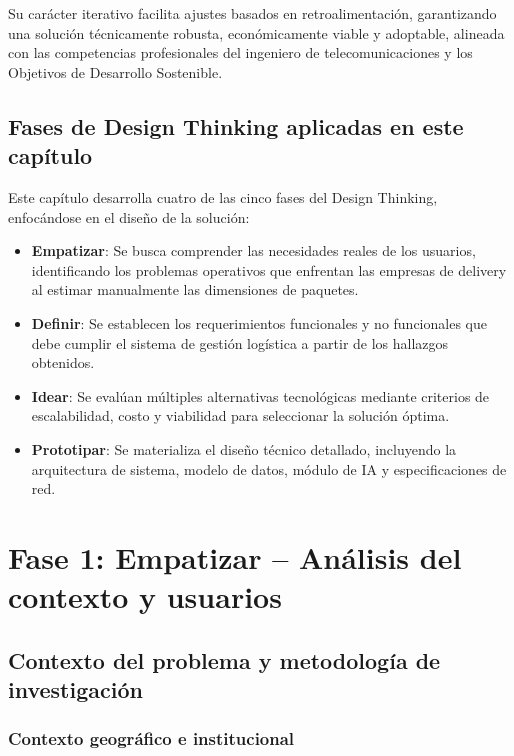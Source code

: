 Su carácter iterativo facilita ajustes basados en retroalimentación, garantizando una solución técnicamente robusta, económicamente viable y adoptable, alineada con las competencias profesionales del ingeniero de telecomunicaciones y los Objetivos de Desarrollo Sostenible.

\subsection{Fases de Design Thinking aplicadas en este capítulo}

Este capítulo desarrolla cuatro de las cinco fases del Design Thinking, enfocándose en el diseño de la solución:

\begin{itemize}
    \item \textbf{Empatizar}: Se busca comprender las necesidades reales de los usuarios, identificando los problemas operativos que enfrentan las empresas de delivery al estimar manualmente las dimensiones de paquetes.
    
    \item \textbf{Definir}: Se establecen los requerimientos funcionales y no funcionales que debe cumplir el sistema de gestión logística a partir de los hallazgos obtenidos.
    
    \item \textbf{Idear}: Se evalúan múltiples alternativas tecnológicas mediante criterios de escalabilidad, costo y viabilidad para seleccionar la solución óptima.
    
    \item \textbf{Prototipar}: Se materializa el diseño técnico detallado, incluyendo la arquitectura de sistema, modelo de datos, módulo de IA y especificaciones de red.
\end{itemize}

\section{Fase 1: Empatizar – Análisis del contexto y usuarios}

\subsection{Contexto del problema y metodología de investigación}

\subsubsection{Contexto geográfico e institucional}

